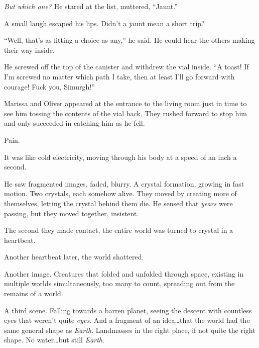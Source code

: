 \emph{But which one?}  He stared at the list, muttered, ``Jaunt.''



A small laugh escaped his lips.  Didn't a jaunt mean a short trip?



``Well, that's as fitting a choice as any,'' he said.  He could hear the others making their way inside.



He screwed off the top of the canister and withdrew the vial inside.  ``A toast!  If I'm screwed no matter which path I take, then at least I'll go forward with courage!  Fuck you, Simurgh!''



Marissa and Oliver appeared at the entrance to the living room just in time to see him tossing the contents of the vial back.  They rushed forward to stop him and only succeeded in catching him as he fell.



Pain.



It was like cold electricity, moving through his body at a speed of an inch a second.



He saw fragmented images, faded, blurry.  A crystal formation, growing in fast motion.  Two crystals, each somehow alive.  They moved by creating more of themselves, letting the crystal behind them die.  He sensed that \emph{years} were passing, but they moved together, insistent.



The second they made contact, the entire world was turned to crystal in a heartbeat.



Another heartbeat later, the world shattered.



Another image.  Creatures that folded and unfolded through space, existing in multiple worlds simultaneously, too many to count, spreading out from the remains of a world.



A third scene.  Falling towards a barren planet, seeing the descent with countless eyes that weren't quite \emph{eyes}.  And a fragment of an idea\ldots that the world had the same general shape as \emph{Earth}.  Landmasses in the right place, if not quite the right shape.  No water\ldots but still \emph{Earth}.



